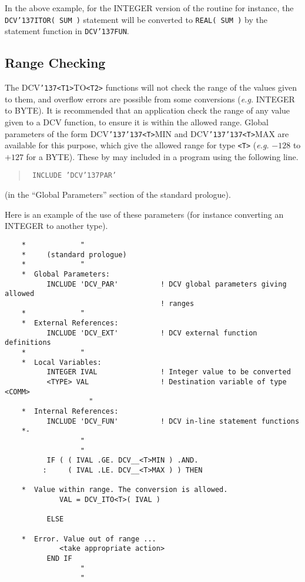 \documentclass[twoside,11pt]{article}
\renewcommand{\_}{{\tt\char'137}}     %
\begin{document}
In the above example, for the INTEGER version of the routine for
instance, the {\tt DCV\_ITOR(~SUM~)} statement will be converted to
{\tt REAL(~SUM~)} by the statement function in {\tt DCV\_FUN}. 

\subsection{Range Checking}

The DCV\_\verb+<T1>+TO\verb+<T2>+ functions will not check the range of the 
values given to them, and overflow errors are possible from some conversions
(\emph{e.g.} INTEGER to BYTE).
It is recommended that an application check the range of any value
given to a DCV function, to ensure it is within the allowed range.
Global parameters of the form DCV\_\_\verb+<T>+MIN and DCV\_\_\verb+<T>+MAX 
are available for this purpose, which give the allowed range for type
\verb+<T>+ (\emph{e.g.} $-128$ to $+127$ for a BYTE).
These by may included in a program using the following line.

\begin{quote}{\tt
INCLUDE 'DCV\_PAR'
}
\end{quote}

(in the ``Global Parameters'' section of the standard prologue).

Here is an example of the use of these parameters (for instance
converting an INTEGER to another type).

\begin{verbatim}
    *             "
    *     (standard prologue)
    *             "
    *  Global Parameters:
          INCLUDE 'DCV_PAR'          ! DCV global parameters giving allowed 
                                     ! ranges
    *             "
    *  External References:
          INCLUDE 'DCV_EXT'          ! DCV external function definitions
    *             "
    *  Local Variables:
          INTEGER IVAL               ! Integer value to be converted
          <TYPE> VAL                 ! Destination variable of type <COMM>
                    "
    *  Internal References:
          INCLUDE 'DCV_FUN'          ! DCV in-line statement functions
    *-
                  "
                  "
          IF ( ( IVAL .GE. DCV__<T>MIN ) .AND.
         :     ( IVAL .LE. DCV__<T>MAX ) ) THEN

    *  Value within range. The conversion is allowed.
             VAL = DCV_ITO<T>( IVAL )

          ELSE
      
    *  Error. Value out of range ...
             <take appropriate action>
          END IF
                  "
                  "
\end{verbatim}
      
\end{document}
